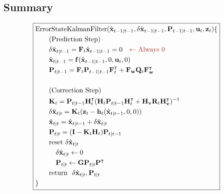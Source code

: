 \documentclass[10pt]{article}
\begin{document}
	\subsection{Summary}
	\begin{equation}  
		\boxed{ \begin{aligned}  
				& \text{ErrorStateKalmanFilter}( \hat{\mathbf{x}}_{t-1|t-1} , \delta \hat{\mathbf{x}}_{t-1|t-1}, \mathbf{P}_{t-1|t-1}, \mathbf{u}_{t}, \mathbf{z}_{t}) \{ \\  
				& \quad\quad \text{(Prediction Step)}\\  
				& \quad\quad \delta \hat{\mathbf{x}}_{t|t-1} = \mathbf{F}_{t}\hat{\mathbf{x}}_{t-1|t-1}= 0 {\color{Mahogany} \quad \leftarrow \text{Always 0} } \\  
				& \quad\quad  \hat{\mathbf{x}}_{t|t-1} = \mathbf{f}(\hat{\mathbf{x}}_{t-1|t-1}, 0,\mathbf{u}_{t}, 0) \\ 
				& \quad\quad \mathbf{P}_{t|t-1} = \mathbf{F}_{t}\mathbf{P}_{t-1|t-1}\mathbf{F}_{t}^{\intercal} + \mathbf{F}_{\mathbf{w}}\mathbf{Q}_{t} \mathbf{F}_{\mathbf{w}}^{\intercal}\\  
				& \\  
				& \quad\quad \text{(Correction Step)} \\  
				& \quad\quad \mathbf{K}_{t} = \mathbf{P}_{t|t-1}\mathbf{H}_{t}^{\intercal}(\mathbf{H}_{t}\mathbf{P}_{t|t-1}\mathbf{H}_{t}^{\intercal} + \mathbf{H}_{\mathbf{v}}\mathbf{R}_{t} \mathbf{H}_{\mathbf{v}}^{\intercal})^{-1} \\  
				& \quad\quad \delta \hat{\mathbf{x}}_{t|t} =  \mathbf{K}_{t}( \mathbf{z}_{t} - \mathbf{h}_{t}(\hat{\mathbf{x}}_{t|t-1},0,0)) \\  
				& \quad\quad \hat{\mathbf{x}}_{t|t} = \hat{\mathbf{x}}_{t|t-1} + \delta \hat{\mathbf{x}}_{t|t} \\  
				& \quad\quad \mathbf{P}_{t|t} = (\mathbf{I} - \mathbf{K}_{t}\mathbf{H}_{t})\mathbf{P}_{t|t-1} \\  
				& \quad \quad \text{reset } \delta \hat{\mathbf{x}}_{t|t}  \\
				& \quad \quad \quad  \delta \hat{\mathbf{x}}_{t|t} \leftarrow 0 \\
				& \quad \quad \quad \mathbf{P}_{t|t} \leftarrow \mathbf{G}\mathbf{P}_{t|t}\mathbf{P}^{\intercal} \\
				& \quad\quad \text{return} \ \ \delta \hat{\mathbf{x}}_{t|t}, \mathbf{P}_{t|t} \\  
				&   \}  
		\end{aligned} } 
	\end{equation}
	
\end{document}

